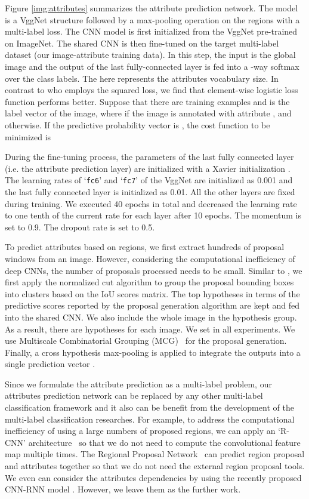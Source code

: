 \documentclass[10pt,journal,compsoc]{IEEEtran}
\begin{document}
Figure \ref{img:attributes} summarizes the attribute prediction network. The model is a VggNet structure followed by a max-pooling operation on the regions with a multi-label loss. The CNN model is first initialized from the VggNet pre-trained on ImageNet.
The shared CNN is then fine-tuned on the target multi-label dataset (our image-attribute training data). In this step, the input is the global image and the output of the last fully-connected layer is fed into a -way softmax over the  class labels. The  here represents the attributes vocabulary size. In contrast to \cite{wei2014cnn} who employs the squared loss, we find that element-wise logistic loss function performs better. Suppose that there are  training examples and  is the label vector of the  image, where  if the image is annotated with attribute , and  otherwise. If the predictive probability vector is , the cost function to be minimized is

During the fine-tuning process, the parameters of the last fully connected layer (i.e. the attribute prediction layer) are initialized with a Xavier initialization \cite{glorot2010understanding}. The learning rates of  `\texttt{fc6}' and `\texttt{fc7}' of the VggNet are initialized as 0.001 and the last fully connected layer is initialized as 0.01. All the other layers are fixed during training. We executed 40 epochs in total and decreased the learning rate to one tenth of the current rate for each layer after 10 epochs. The momentum is set to 0.9. The dropout rate is set to 0.5.

To predict attributes based on regions, we first extract hundreds of proposal windows from an image. However, considering the computational inefficiency of deep CNNs, the number of proposals processed needs to be small. Similar to \cite{wei2014cnn}, we first apply the normalized cut algorithm to group the proposal bounding boxes into  clusters based on the IoU scores matrix. The top  hypotheses in terms of the predictive scores reported by the proposal generation algorithm are kept and fed into the shared CNN. We also include the whole image in the hypothesis group. As a result, there are  hypotheses for each image. We set  in all experiments. We use Multiscale Combinatorial Grouping (MCG)~\cite{PABMM2015} for the proposal generation. Finally, a cross hypothesis max-pooling is applied to integrate the outputs into a single prediction vector .

Since we formulate the attribute prediction as a multi-label problem, our attributes prediction network can be replaced by any other multi-label classification framework and it also can be benefit from the development of the multi-label classification researches. For example, to address the computational inefficiency of using a large numbers of proposed regions, we can apply an `R-CNN' architecture~\cite{girshick2015fast} so that we do not need to compute the convolutional feature map multiple times. The Regional Proposal Network~\cite{ren2015faster} can predict region proposal and attributes together so that we do not need the external region proposal tools. We even can consider the attributes dependencies by using the recently proposed CNN-RNN model \cite{wang2016cnn}. However, we leave them as the further work.
\end{document}
